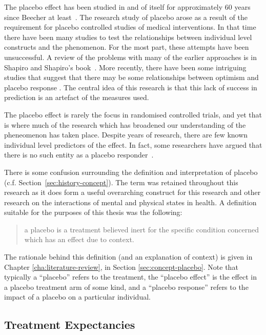The placebo effect has been studied in and of itself for approximately 60 years since Beecher at least~\cite{beecher1955powerful}. The research study of placebo arose as a result of the requirement for placebo controlled studies of medical interventions. In that time there have been many studies to test the relationships between individual level constructs and the phenomenon. For the most part, these attempts have been unsuccessful. A review of the problems with many of the earlier approaches is in Shapiro and Shapiro's book~\cite{Shapiro1997}. More recently, there have been some intriguing studies that suggest that there may be some relationships between optimism and placebo response \cite{Geers2005,morton2009reproducibility}. The central idea of this research is that this lack of success in prediction is an artefact of the measures used. 

The placebo effect is rarely the focus in randomised controlled trials, and yet that is where much of the research which has broadened our understanding of the pheneomenon has taken place.
Despite years of research, there are few known individual level predictors of the effect. In fact, some researchers have argued that there is no such entity as a placebo responder~\cite{Kaptchuk2008a}. 


There is some confusion surrounding the definition and interpretation of placebo (c.f. Section~\ref{sec:history-concept}).  The term was retained throughout this research  as it does form a useful overarching construct for this research and other research on the interactions of mental and physical states in health. A definition suitable for the purposes of this thesis was the following:

\begin{quotation}
  a placebo is a treatment believed inert for the specific condition
  concerned which has an effect due to context.
\end{quotation}

The rationale behind this definition (and an explanation of context) is given in Chapter \ref{cha:literature-review}, in Section \ref{sec:concept-placebo}. Note that typically a ``placebo'' refers to the treatment, the ``placebo effect'' is the effect in a placebo treatment arm of some kind, and a ``placebo response'' refers to the impact of a placebo on a particular individual.



\subsection{Treatment Expectancies}
\label{sec:placebo-expectancies}

